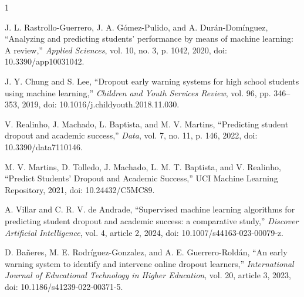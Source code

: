 \documentclass[lettersize,journal]{IEEEtran}
\begin{document}
\begin{thebibliography}{1}

J. L. Rastrollo-Guerrero, J. A. G\'{o}mez-Pulido, and A. Dur\'{a}n-Dom\'{i}nguez, ``Analyzing and predicting students' performance by means of machine learning: A review,'' \emph{Applied Sciences}, vol. 10, no. 3, p. 1042, 2020, doi: 10.3390/app10031042.

J. Y. Chung and S. Lee, ``Dropout early warning systems for high school students using machine learning,'' \emph{Children and Youth Services Review}, vol. 96, pp. 346--353, 2019, doi: 10.1016/j.childyouth.2018.11.030.

V. Realinho, J. Machado, L. Baptista, and M. V. Martins, ``Predicting student dropout and academic success,'' \emph{Data}, vol. 7, no. 11, p. 146, 2022, doi: 10.3390/data7110146.

M. V. Martins, D. Tolledo, J. Machado, L. M. T. Baptista, and V. Realinho, ``Predict Students' Dropout and Academic Success,'' UCI Machine Learning Repository, 2021, doi: 10.24432/C5MC89.

A. Villar and C. R. V. de Andrade, ``Supervised machine learning algorithms for predicting student dropout and academic success: a comparative study,'' \emph{Discover Artificial Intelligence}, vol. 4, article 2, 2024, doi: 10.1007/s44163-023-00079-z.

D. Ba\~{n}eres, M. E. Rodr\'{i}guez-Gonzalez, and A. E. Guerrero-Rold\'{a}n, ``An early warning system to identify and intervene online dropout learners,'' \emph{International Journal of Educational Technology in Higher Education}, vol. 20, article 3, 2023, doi: 10.1186/s41239-022-00371-5.

\end{thebibliography}
\end{document}
